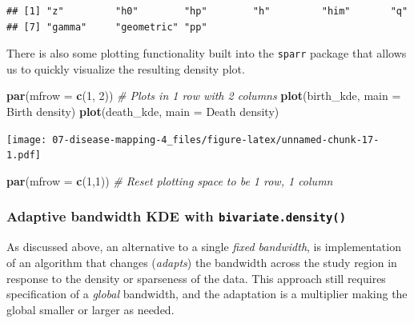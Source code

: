 \documentclass[
]{book}
\newenvironment{Shaded}{\begin{snugshade}}{\end{snugshade}}
\newcommand{\AttributeTok}[1]{\textcolor[rgb]{0.13,0.29,0.53}{#1}}
\newcommand{\CommentTok}[1]{\textcolor[rgb]{0.56,0.35,0.01}{\textit{#1}}}
\newcommand{\DecValTok}[1]{\textcolor[rgb]{0.00,0.00,0.81}{#1}}
\newcommand{\FunctionTok}[1]{\textcolor[rgb]{0.13,0.29,0.53}{\textbf{#1}}}
\newcommand{\NormalTok}[1]{#1}
\newcommand{\StringTok}[1]{\textcolor[rgb]{0.31,0.60,0.02}{#1}}
\begin{document}
\begin{verbatim}
## [1] "z"         "h0"        "hp"        "h"         "him"       "q"        
## [7] "gamma"     "geometric" "pp"
\end{verbatim}

There is also some plotting functionality built into the \texttt{sparr} package that allows us to quickly visualize the resulting density plot.

\begin{Shaded}
\begin{Highlighting}[]
\FunctionTok{par}\NormalTok{(}\AttributeTok{mfrow =} \FunctionTok{c}\NormalTok{(}\DecValTok{1}\NormalTok{, }\DecValTok{2}\NormalTok{)) }\CommentTok{\# Plots in 1 row with 2 columns}
\FunctionTok{plot}\NormalTok{(birth\_kde, }\AttributeTok{main =} \StringTok{\textquotesingle{}Birth density\textquotesingle{}}\NormalTok{)}
\FunctionTok{plot}\NormalTok{(death\_kde, }\AttributeTok{main =} \StringTok{\textquotesingle{}Death density\textquotesingle{}}\NormalTok{)}
\end{Highlighting}
\end{Shaded}

\texttt{[image: 07-disease-mapping-4\_files/figure-latex/unnamed-chunk-17-1.pdf]}

\begin{Shaded}
\begin{Highlighting}[]
\FunctionTok{par}\NormalTok{(}\AttributeTok{mfrow =} \FunctionTok{c}\NormalTok{(}\DecValTok{1}\NormalTok{,}\DecValTok{1}\NormalTok{))  }\CommentTok{\# Reset plotting space to be 1 row, 1 column}
\end{Highlighting}
\end{Shaded}

\hypertarget{adaptive-bandwidth-kde-with-bivariate.density}{%
\subsubsection{\texorpdfstring{Adaptive bandwidth KDE with \texttt{bivariate.density()}}{Adaptive bandwidth KDE with bivariate.density()}}\label{adaptive-bandwidth-kde-with-bivariate.density}}

As discussed above, an alternative to a single \emph{fixed bandwidth}, is implementation of an algorithm that changes (\emph{adapts}) the bandwidth across the study region in response to the density or sparseness of the data. This approach still requires specification of a \emph{global} bandwidth, and the adaptation is a multiplier making the global smaller or larger as needed.
\end{document}
